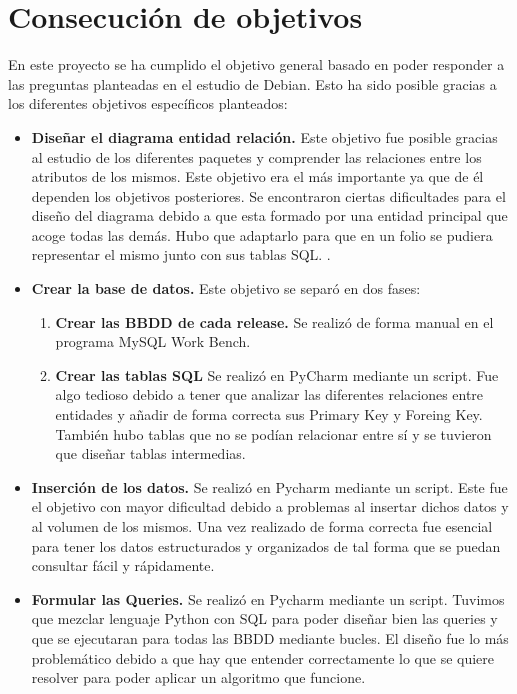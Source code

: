 \documentclass[a4paper, 12pt]{book}
\begin{document}
\section{Consecución de objetivos}
\label{sec:consecucion-objetivos}

En este proyecto se ha cumplido el objetivo general basado en poder responder a las preguntas planteadas en el estudio de Debian. Esto ha sido posible gracias a los diferentes objetivos específicos planteados:

\begin{itemize}
	\item \textbf {Diseñar el diagrama entidad relación.} Este objetivo fue posible gracias al estudio de los diferentes paquetes y comprender las relaciones entre los atributos de los mismos. Este objetivo era el más importante ya que de él dependen los objetivos posteriores.
	Se encontraron ciertas dificultades para el diseño del diagrama debido a que esta formado por una entidad principal que acoge todas las demás. Hubo que adaptarlo para que en un folio se pudiera representar el mismo junto con sus tablas SQL.
	.
	\item \textbf {Crear la base de datos.} Este objetivo se separó en dos fases:
	\begin{enumerate}
		
		\item \textbf{Crear las BBDD de cada release.} Se realizó de forma manual en el programa MySQL Work Bench.
		
		\item \textbf{Crear las tablas SQL} Se realizó en PyCharm mediante un script. Fue algo tedioso debido a tener que analizar las diferentes relaciones entre entidades y añadir de forma correcta sus Primary Key y Foreing Key. También hubo tablas que no se podían relacionar entre sí y se tuvieron que diseñar tablas intermedias.
		
	\end{enumerate}
	\item \textbf {Inserción de los datos.} Se realizó en Pycharm mediante un script. Este fue el objetivo con mayor dificultad debido a problemas al insertar dichos datos y al volumen de los mismos. Una vez realizado de forma correcta fue esencial para tener los datos estructurados y organizados de tal forma que se puedan consultar fácil y rápidamente.
	
	\item \textbf {Formular las Queries.} Se realizó en Pycharm mediante un script. Tuvimos que mezclar lenguaje Python con SQL para poder diseñar bien las queries y que se ejecutaran para todas las BBDD mediante bucles. El diseño fue lo más problemático debido a que hay que entender correctamente lo que se quiere resolver para poder aplicar un algoritmo que funcione. 
	

\end{itemize}
\end{document}
